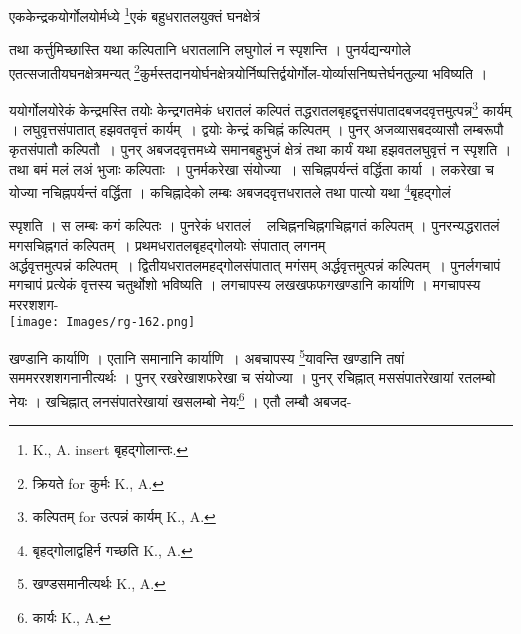 \documentclass[11pt, openany]{book}
\begin{document}
{\ab एककेन्द्रकयोर्गोलयोर्मध्ये \renewcommand{\thefootnote}{५}\footnote{{\en K., A. insert} बृहद्गोलान्तः.}एकं बहुधरातलयुक्तं घनक्षेत्रं }


\newpage
\noindent तथा कर्त्तुमिच्छास्ति यथा कल्पितानि धरातलानि लघुगोलं न स्पृशन्ति । पुनर्यद्यन्यगोले एतत्सजातीयघनक्षेत्रमन्यत् \renewcommand{\thefootnote}{१}\footnote{क्रियते {\en for} कुर्मः {\en K., A.} }कुर्मस्तदानयोर्घनक्षेत्रयोर्निष्पत्तिर्द्वयोर्गोल-योर्व्यासनिष्पत्तेर्घनतुल्या भविष्यति । \\
\vspace{5mm}

ययोर्गोलयोरेकं केन्द्रमस्ति तयोः केन्द्रगतमेकं धरातलं कल्पितं तद्धरातलबृहद्वृत्तसंपातादबजदवृत्तमुत्पन्न\renewcommand{\thefootnote}{२}\footnote{कल्पितम् {\en for} उत्पन्नं कार्यम् {\en K., A.}} कार्यम् । लघुवृत्तसंपातात् हझवतवृत्तं कार्यम्~। द्वयोः केन्द्रं कचिह्नं कल्पितम् । पुनर् अजव्यासबदव्यासौ लम्बरूपौ कृतसंपातौ कल्पितौ~। पुनर् अबजदवृत्तमध्ये समानबहुभुजं क्षेत्रं तथा कार्यं यथा हझवतलघुवृत्तं न स्पृशति । तथा बमं मलं लअं भुजाः कल्पिताः~। पुनर्मकरेखा संयोज्या~। सचिह्नपर्यन्तं वर्द्धिता कार्या । लकरेखा च योज्या नचिह्नपर्यन्तं वर्द्धिता । कचिह्नादेको लम्बः अबजदवृत्तधरातले तथा पात्यो यथा \renewcommand{\thefootnote}{३}\footnote{बृहद्गोलाद्वहिर्न गच्छति {\en K., A.} }बृहद्गोलं 
 \begin{vwcol}[widths={0.65,0.35}, sep=.8cm, rule=0pt]
स्पृशति । स लम्बः कगं कल्पितः । पुनरेकं धरातलं   लचिह्ननचिह्नगचिह्नगतं कल्पितम् । पुनरन्यद्धरातलं मगसचिह्नगतं कल्पितम्~। प्रथमधरातलबृहद्गोलयोः संपातात् लगनम्\\ \noindent  अर्द्धवृत्तमुत्पन्नं कल्पितम्~। द्वितीयधरातलमहद्गोलसंपातात् मगंसम् अर्द्धवृत्तमुत्पन्नं कल्पितम्~। पुनर्लगचापं मगचापं प्रत्येकं वृत्तस्य चतुर्थोशो भविष्यति । लगचापस्य लखखफफगखण्डानि कार्याणि । मगचापस्य मररशशग-\\
\noindent \texttt{[image: Images/rg-162.png]}  
\end{vwcol}
\vspace{-6mm}

\noindent खण्डानि कार्याणि । एतानि समानानि कार्याणि~। अबचापस्य \renewcommand{\thefootnote}{४}\footnote{खण्डसमानीत्यर्थः {\en K., A.} }यावन्ति खण्डानि तषां सममररशशगनानीत्यर्थः । पुनर् रखरेखाशफरेखा च संयोज्या । पुनर् रचिह्नात् मससंपातरेखायां रतलम्बो नेयः
 । खचिह्नात् लनसंपातरेखायां खसलम्बो नेयः\renewcommand{\thefootnote}{५}\footnote{कार्यः {\en K., A.}} । एतौ लम्बौ अबजद-
\end{document}
